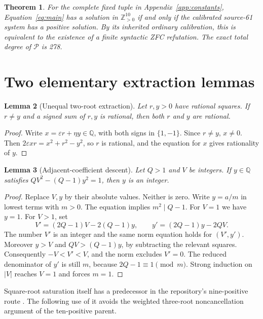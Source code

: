 \documentclass[11pt]{article}
\newtheorem{theorem}{Theorem}[section]
\newtheorem{lemma}[theorem]{Lemma}
\theoremstyle{remark}\newtheorem{remark}[theorem]{Remark}
\newcommand{\Zp}{\mathbb Z_{>0}}
\begin{document}
\begin{theorem}\label{thm:ten}
For the complete fixed tuple in Appendix~\ref{app:constants},
Equation~\eqref{eq:main} has a solution in $\Zp^{10}$ if and only if
the calibrated source-61 system has a positive solution. By its inherited
ordinary calibration, this is equivalent to the existence of a finite
syntactic ZFC refutation. The exact total degree of $\mathcal P$ is 278.
\end{theorem}

\section{Two elementary extraction lemmas}

\begin{lemma}[Unequal two-root extraction]\label{lem:two}
Let $r,y>0$ have rational squares. If $r\ne y$ and a signed sum of
$r,y$ is rational, then both $r$ and $y$ are rational.
\end{lemma}
\begin{proof}
Write $x=\varepsilon r+\eta y\in\mathbb Q$, with both signs in
$\{1,-1\}$. Since $r\ne y$, $x\ne0$. Then
$2\varepsilon xr=x^2+r^2-y^2$, so $r$ is rational, and the equation
for $x$ gives rationality of $y$.
\end{proof}

\begin{lemma}[Adjacent-coefficient descent]\label{lem:adjacent}
Let $Q>1$ and $V$ be integers. If $y\in\mathbb Q$ satisfies
$QV^2-(Q-1)y^2=1$, then $y$ is an integer.
\end{lemma}
\begin{proof}
Replace $V,y$ by their absolute values. Neither is zero. Write $y=a/m$
in lowest terms with $m>0$. The equation implies $m^2\mid Q-1$.
For $V=1$ we have $y=1$. For $V>1$, set
\[
V'=(2Q-1)V-2(Q-1)y,\qquad
y'=(2Q-1)y-2QV.
\]
The number $V'$ is an integer and the same norm equation holds for
$(V',y')$. Moreover $y>V$ and $QV>(Q-1)y$, by subtracting the relevant
squares. Consequently $-V<V'<V$, and the norm excludes $V'=0$.
The reduced denominator of $y'$ is still $m$, because
$2Q-1\equiv1\pmod m$. Strong induction on $|V|$ reaches $V=1$ and
forces $m=1$.
\end{proof}

Square-root saturation itself has a predecessor in the repository's
nine-positive route \cite{ninesaturation}. The following use of it avoids
the weighted three-root noncancellation argument of the ten-positive parent.
\end{document}
